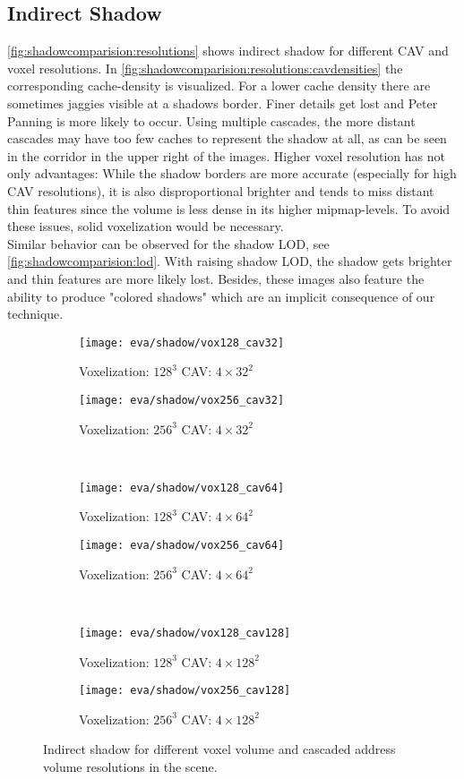 \documentclass[thesis.tex]{subfiles}
\begin{document}
\subsection{Indirect Shadow}
\autoref{fig:shadowcomparision:resolutions} shows indirect shadow for different CAV and voxel resolutions.
In \autoref{fig:shadowcomparision:resolutions:cavdensities} the corresponding cache-density is visualized.
For a lower cache density there are sometimes jaggies visible at a shadows border.
Finer details get lost and Peter Panning is more likely to occur.
Using multiple cascades, the more distant cascades may have too few caches to represent the shadow at all, as can be seen in the corridor in the upper right of the images.
Higher voxel resolution has not only advantages:
While the shadow borders are more accurate (especially for high CAV resolutions), it is also disproportional brighter and tends to miss distant thin features since the volume is less dense in its higher mipmap-levels.
To avoid these issues, solid voxelization would be necessary.
\\
Similar behavior can be observed for the shadow LOD, see \autoref{fig:shadowcomparision:lod}.
With raising shadow LOD, the shadow gets brighter and thin features are more likely lost.
Besides, these images also feature the ability to produce "colored shadows" which are an implicit consequence of our technique.
%
\begin{figure}
\centering
\begin{subfigure}[b]{\halfpageimage}
\texttt{[image: eva/shadow/vox128\_cav32]}
\caption{Voxelization: $128^3$ CAV: $4\times32^2$}
\end{subfigure}
\begin{subfigure}[b]{\halfpageimage}
\texttt{[image: eva/shadow/vox256\_cav32]}
\caption{Voxelization: $256^3$ CAV: $4\times32^2$}
\end{subfigure}
\\
\begin{subfigure}[b]{\halfpageimage}
\texttt{[image: eva/shadow/vox128\_cav64]}
\caption{Voxelization: $128^3$ CAV: $4\times64^2$}
\end{subfigure}
\begin{subfigure}[b]{\halfpageimage}
\texttt{[image: eva/shadow/vox256\_cav64]}
\caption{Voxelization: $256^3$ CAV: $4\times64^2$}
\end{subfigure}
\\
\begin{subfigure}[b]{\halfpageimage}
\texttt{[image: eva/shadow/vox128\_cav128]}
\caption{Voxelization: $128^3$ CAV: $4\times128^2$}
\end{subfigure}
\begin{subfigure}[b]{\halfpageimage}
\texttt{[image: eva/shadow/vox256\_cav128]}
\caption{Voxelization: $256^3$ CAV: $4\times128^2$}
\end{subfigure}
\caption{Indirect shadow for different voxel volume and cascaded address volume resolutions in the  scene.}
\label{fig:shadowcomparision:resolutions}
\end{figure}
\end{document}
